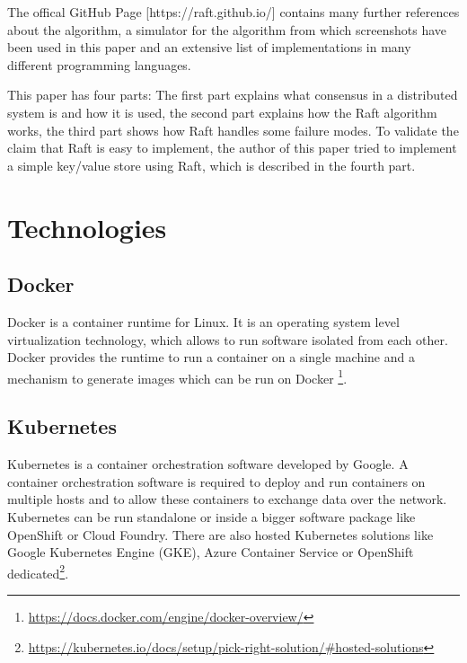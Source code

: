 The offical GitHub Page [https://raft.github.io/] contains many further references about the algorithm, a simulator for the algorithm from which screenshots have been used in this paper and an extensive list of implementations in many different programming languages.

This paper has four parts: The first part explains what consensus in a distributed system is and how it is used, the second part explains how the Raft algorithm works, the third part shows how Raft handles some failure modes. To validate the claim that Raft is easy to implement, the author of this paper tried to implement a simple key/value store using Raft, which is described in the fourth part.

\section{Technologies}\label{technologies}

\subsection{Docker}\label{docker}

Docker is a container runtime for Linux. It is an operating system level
virtualization technology, which allows to run software isolated from
each other. Docker provides the runtime to run a container on a single
machine and a mechanism to generate images which can be run on Docker
\footnote{\url{https://docs.docker.com/engine/docker-overview/}}.

\subsection{Kubernetes}\label{kubernetes}

Kubernetes is a container orchestration software developed by Google. A
container orchestration software is required to deploy and run
containers on multiple hosts and to allow these containers to exchange
data over the network. Kubernetes can be run standalone or inside a
bigger software package like OpenShift or Cloud Foundry. There are also
hosted Kubernetes solutions like Google Kubernetes Engine (GKE), Azure
Container Service or OpenShift dedicated\footnote{\url{https://kubernetes.io/docs/setup/pick-right-solution/\#hosted-solutions}}.



